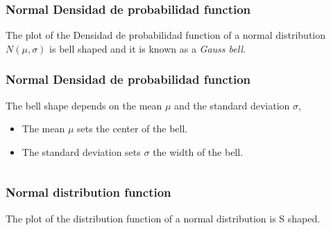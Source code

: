 \begin{frame}
\frametitle{Normal Densidad de probabilidad function}
The plot of the Densidad de probabilidad function of a normal distribution $N(\mu,\sigma)$ is bell shaped and it is known as a \emph{Gauss bell}.
\begin{center}
\end{center}
\end{frame}


\begin{frame}
\frametitle{Normal Densidad de probabilidad function}
The bell shape depends on the mean $\mu$ and the standard deviation $\sigma$,
\begin{itemize}
\item The mean $\mu$ sets the center of the bell.
\item The standard deviation sets $\sigma$ the width of the bell.
\end{itemize}
\medskip
\begin{columns}
\begin{column}{0.47\textwidth}

\end{column}
\begin{column}{0.47\textwidth}
\end{column}
\end{columns}
\end{frame}


\begin{frame}
\frametitle{Normal distribution function}
The plot of the distribution function of a normal distribution is S shaped. 
\begin{center}
\end{center}
\end{frame}


